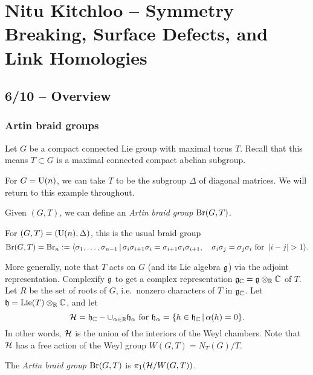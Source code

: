 \chapter{Nitu Kitchloo -- Symmetry Breaking, Surface Defects, and Link Homologies}

\section{6/10 -- Overview}

\subsection{Artin braid groups}

Let $G$ be a compact connected Lie group with maximal torus $T$.
Recall that this means $T \subset G$ is a maximal connected compact abelian subgroup.

\begin{ex}
	For $G = \mathrm{U}(n)$, we can take $T$ to be the subgroup $\Delta$ of diagonal matrices.
	We will return to this example throughout.
\end{ex}

Given $(G,T)$, we can define an \emph{Artin braid group} $\mathrm{Br}(G, T)$.

\begin{ex}
	For $(G, T) = (\mathrm{U}(n), \Delta)$, this is the usual braid group
	\[
		\mathrm{Br}(G, T) = \mathrm{Br}_n := \langle \sigma_1, \dots, \sigma_{n-1} \, | \, \sigma_i \sigma_{i+1} \sigma_i = \sigma_{i+1} \sigma_i \sigma_{i+1}, \hspace{1em} \sigma_i \sigma_j = \sigma_j \sigma_i \textrm{ for } \left|{i - j}\right| > 1 \rangle.
	\]
\end{ex}

More generally, note that $T$ acts on $G$ (and its Lie algebra $\mathfrak{g}$) via the adjoint representation.
Complexify $\mathfrak{g}$ to get a complex representation $\mathfrak{g}_{\mathbb{C}} = \mathfrak{g} \otimes_{\mathbb{R}} \mathbb{C}$ of $T$.
Let $R$ be the set of roots of $G$, i.e.\ nonzero characters of $T$ in $\mathfrak{g}_{\mathbb{C}}$.
Let $\mathfrak{h} = \operatorname{Lie}(T) \otimes_{\mathbb{R}} \mathbb{C}$, and let
\[
	\mathcal{H} = \mathfrak{h}_{\mathbb{C}} - \cup_{\alpha \in \mathbb{R}} \mathfrak{h}_\alpha \textrm{ for } \mathfrak{h}_\alpha = \{ h \in \mathfrak{h}_{\mathbb{C}} \, | \, \alpha(h) = 0 \}.
\]
In other words, $\mathcal{H}$ is the union of the interiors of the Weyl chambers.
Note that $\mathcal{H}$ has a free action of the Weyl group $W(G, T) = N_T(G) / T$.

\begin{dfn}
	The \emph{Artin braid group} $\mathrm{Br}(G, T)$ is $\pi_1(\mathcal{H} / W(G, T))$.
\end{dfn}

